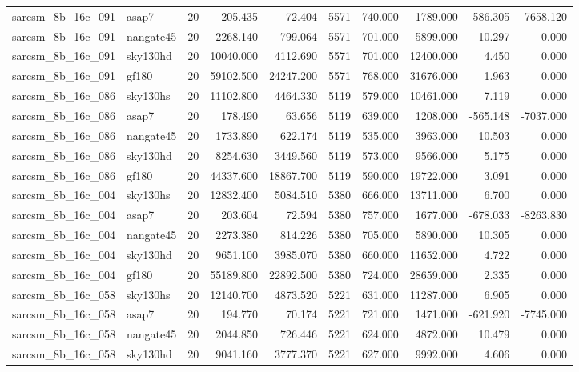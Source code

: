 \begin{tabular}{llrrrrrrrr}
sarcsm\_8b\_16c\_091 & asap7 & 20 & 205.435 & 72.404 & 5571 & 740.000 & 1789.000 & -586.305 & -7658.120 \\
sarcsm\_8b\_16c\_091 & nangate45 & 20 & 2268.140 & 799.064 & 5571 & 701.000 & 5899.000 & 10.297 & 0.000 \\
sarcsm\_8b\_16c\_091 & sky130hd & 20 & 10040.000 & 4112.690 & 5571 & 701.000 & 12400.000 & 4.450 & 0.000 \\
sarcsm\_8b\_16c\_091 & gf180 & 20 & 59102.500 & 24247.200 & 5571 & 768.000 & 31676.000 & 1.963 & 0.000 \\
sarcsm\_8b\_16c\_086 & sky130hs & 20 & 11102.800 & 4464.330 & 5119 & 579.000 & 10461.000 & 7.119 & 0.000 \\
sarcsm\_8b\_16c\_086 & asap7 & 20 & 178.490 & 63.656 & 5119 & 639.000 & 1208.000 & -565.148 & -7037.000 \\
sarcsm\_8b\_16c\_086 & nangate45 & 20 & 1733.890 & 622.174 & 5119 & 535.000 & 3963.000 & 10.503 & 0.000 \\
sarcsm\_8b\_16c\_086 & sky130hd & 20 & 8254.630 & 3449.560 & 5119 & 573.000 & 9566.000 & 5.175 & 0.000 \\
sarcsm\_8b\_16c\_086 & gf180 & 20 & 44337.600 & 18867.700 & 5119 & 590.000 & 19722.000 & 3.091 & 0.000 \\
sarcsm\_8b\_16c\_004 & sky130hs & 20 & 12832.400 & 5084.510 & 5380 & 666.000 & 13711.000 & 6.700 & 0.000 \\
sarcsm\_8b\_16c\_004 & asap7 & 20 & 203.604 & 72.594 & 5380 & 757.000 & 1677.000 & -678.033 & -8263.830 \\
sarcsm\_8b\_16c\_004 & nangate45 & 20 & 2273.380 & 814.226 & 5380 & 705.000 & 5890.000 & 10.305 & 0.000 \\
sarcsm\_8b\_16c\_004 & sky130hd & 20 & 9651.100 & 3985.070 & 5380 & 660.000 & 11652.000 & 4.722 & 0.000 \\
sarcsm\_8b\_16c\_004 & gf180 & 20 & 55189.800 & 22892.500 & 5380 & 724.000 & 28659.000 & 2.335 & 0.000 \\
sarcsm\_8b\_16c\_058 & sky130hs & 20 & 12140.700 & 4873.520 & 5221 & 631.000 & 11287.000 & 6.905 & 0.000 \\
sarcsm\_8b\_16c\_058 & asap7 & 20 & 194.770 & 70.174 & 5221 & 721.000 & 1471.000 & -621.920 & -7745.000 \\
sarcsm\_8b\_16c\_058 & nangate45 & 20 & 2044.850 & 726.446 & 5221 & 624.000 & 4872.000 & 10.479 & 0.000 \\
sarcsm\_8b\_16c\_058 & sky130hd & 20 & 9041.160 & 3777.370 & 5221 & 627.000 & 9992.000 & 4.606 & 0.000 \\

\end{tabular}
